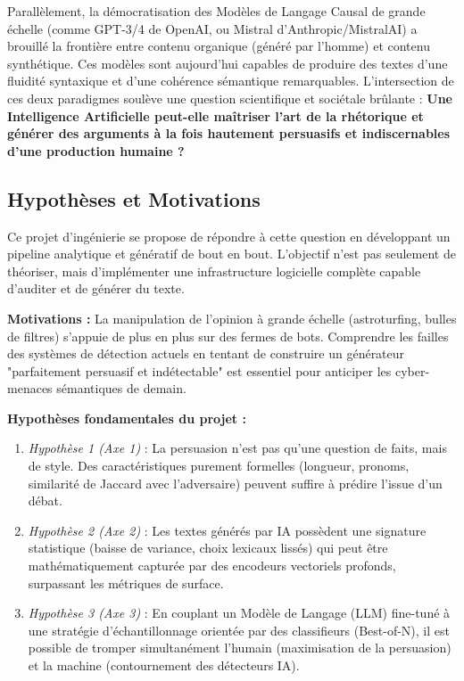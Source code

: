 \documentclass[11pt,a4paper]{article}
\begin{document}
Parallèlement, la démocratisation des Modèles de Langage Causal de grande échelle (comme GPT-3/4 de OpenAI, ou Mistral d'Anthropic/MistralAI) a brouillé la frontière entre contenu organique (généré par l'homme) et contenu synthétique. Ces modèles sont aujourd'hui capables de produire des textes d'une fluidité syntaxique et d'une cohérence sémantique remarquables. L'intersection de ces deux paradigmes soulève une question scientifique et sociétale brûlante : \textbf{Une Intelligence Artificielle peut-elle maîtriser l'art de la rhétorique et générer des arguments à la fois hautement persuasifs et indiscernables d'une production humaine ?}

\subsection{Hypothèses et Motivations}
Ce projet d'ingénierie se propose de répondre à cette question en développant un pipeline analytique et génératif de bout en bout. L'objectif n'est pas seulement de théoriser, mais d'implémenter une infrastructure logicielle complète capable d'auditer et de générer du texte. 

\textbf{Motivations :}
La manipulation de l'opinion à grande échelle (astroturfing, bulles de filtres) s'appuie de plus en plus sur des fermes de bots. Comprendre les failles des systèmes de détection actuels en tentant de construire un générateur "parfaitement persuasif et indétectable" est essentiel pour anticiper les cyber-menaces sémantiques de demain.

\textbf{Hypothèses fondamentales du projet :}
\begin{enumerate}
    \item \textit{Hypothèse 1 (Axe 1)} : La persuasion n'est pas qu'une question de faits, mais de style. Des caractéristiques purement formelles (longueur, pronoms, similarité de Jaccard avec l'adversaire) peuvent suffire à prédire l'issue d'un débat.
    \item \textit{Hypothèse 2 (Axe 2)} : Les textes générés par IA possèdent une signature statistique (baisse de variance, choix lexicaux lissés) qui peut être mathématiquement capturée par des encodeurs vectoriels profonds, surpassant les métriques de surface.
    \item \textit{Hypothèse 3 (Axe 3)} : En couplant un Modèle de Langage (LLM) fine-tuné à une stratégie d'échantillonnage orientée par des classifieurs (Best-of-N), il est possible de tromper simultanément l'humain (maximisation de la persuasion) et la machine (contournement des détecteurs IA).
\end{enumerate}
\end{document}
